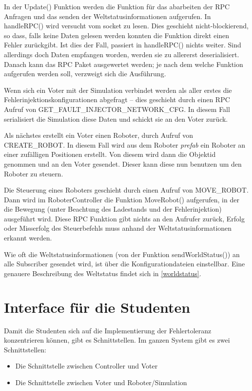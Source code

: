 In der Update() Funktion werden die Funktion f{\"{u}}r das abarbeiten der RPC Anfragen und das senden der Weltstatusinformationen aufgerufen. In handleRPC()
wird versucht vom socket zu lesen. Dies geschieht nicht-blockierend, so dass, falls keine Daten gelesen werden konnten die Funktion direkt einen Fehler
zur{\"{u}}ckgibt. Ist dies der Fall, passiert in handleRPC() nichts weiter. Sind allerdings doch Daten empfangen worden, werden sie zu allererst deserialisiert.
Danach kann das RPC Paket ausgewertet werden; je nach dem welche Funktion aufgerufen werden soll, verzweigt sich die Ausf{\"{u}}hrung.

Wenn sich ein Voter mit der Simulation verbindet werden als aller erstes die Fehlerinjektionskonfigurationen abgefragt -- dies geschieht durch einen RPC Aufruf
von GET\_FAULT\_INJECTOR\_NETWORK\_CFG. In diesem Fall serialisiert die Simulation diese Daten und schickt sie an den Voter zur{\"{u}}ck.

Als n{\"{a}}chstes erstellt ein Voter einen Roboter, durch Aufruf von CREATE\_ROBOT. In diesem Fall wird aus dem Roboter \textit{prefab} ein Roboter an einer
zuf{\"{a}}lligen Positionen erstellt. Von diesem wird dann die Objektid genommen und an den Voter gesendet. Dieser kann diese nun benutzen um den Roboter zu
steuern.

Die Steuerung eines Roboters geschieht durch einen Aufruf von MOVE\_ROBOT. Dann wird im RoboterController die Funktion MoveRobot() aufgerufen, in der die
Bewegung (unter Beachtung des Ladestands und der Fehlerinjektion) ausgef{\"{u}}hrt wird. Diese RPC Funktion gibt nichts an den Aufrufer zur{\"{u}}ck, Erfolg
oder Misserfolg des Steuerbefehls muss anhand der Weltstatusinformationen erkannt werden.

Wie oft die Weltstatusinformationen (von der Funktion sendWorldStatus()) an alle Subscriber gesendet wird, ist {\"{u}}ber die Konfigurationdateien
einstellbar. Eine genauere Beschreibung des Weltstatus findet sich in \ref{worldstatus}.

\clearpage
\section{Interface f{\"{u}}r die Studenten}\label{interface}
Damit die Studenten sich auf die Implementierung der Fehlertoleranz konzentrieren k{\"{o}}nnen, gibt es Schnittstellen.
Im ganzen System gibt es zwei Schnittstellen:
\begin{itemize}
\item Die Schnittstelle zwischen Controller und Voter
\item Die Schnittstelle zwischen Voter und Roboter/Simulation
\end{itemize}

